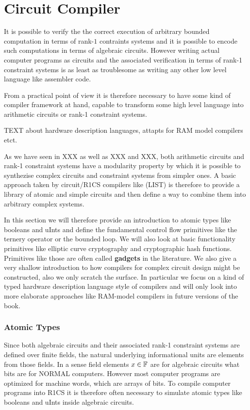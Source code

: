 \chapter{Circuit Compiler} 


It is possible to verify the the correct execution of arbitrary bounded computation in terms of rank-$1$ contraints systems and it is possible to encode such computations in terms of algebraic circuits. However writing actual computer programs as circuits and the associated verification in terms of rank-1 constraint systems is as least as troublesome as writing any other low level language like assembler code. 

From a practical point of view it is therefore necessary to have some kind of compiler framework at hand, capable to transform some high level language into arithmetic circuits or rank-1 constraint systems. 

TEXT about hardware description languages, attapts for RAM model compilers etct.

As we have seen in XXX as well as XXX and XXX, both arithmetic circuits and rank-1 constraint systems have a modularity property by which it is possible to synthezise  complex circuits and constraint systems from simpler ones. A basic approach taken by circuit/R1CS compilers like (LIST) is therefore to provide a library of atomic and simple circuits and then define a way to combine them into arbitrary complex systems. 

In this section we will therefore provide an introduction to atomic types like booleans and uInts and define the fundamental control flow primitives like the ternery operator or the bounded loop. We will also look at basic functionality primitives like elliptic curve cryptography and cryptographic hash functions. Primitives like those are often called \textbf{gadgets} in the literature. We also give a very shallow introduction to how compilers for complex circuit design might be constructed, also we only scratch the surface. In particular we focus on a kind of typed hardware description language style of compilers and will only look into more elaborate approaches like RAM-model compilers in future versions of the book.
\subsection{Atomic Types} 
Since both algebraic circuits and their associated rank-1 constraint systems are defined over finite fields, the natural underlying informational units are elements from those fields. In a sense field elements $x\in \mathbb{F}$ are for algebraic circuits what bits are for NORMAL computers. However most computer programs are optimized for machine words, which are arrays of bits. To compile computer programs into R1CS it is therefore often necessary to simulate atomic types like booleans and uInts inside algebraic circuits.
